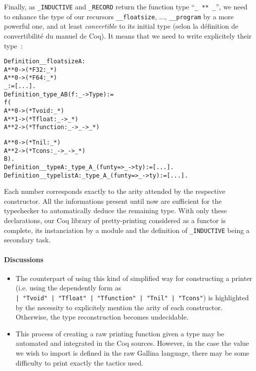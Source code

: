 \documentclass[a4paper, 11pt]{article}
\newenvironment{coq}
  {\selectlanguage{english} \begin{alltt}} %% 8.3pl1 (January 2011)
  {\end{alltt} \selectlanguage{francais}}
\begin{document}
Finally, as \verb|_INDUCTIVE| and \verb|_RECORD| return the function type ``\verb|_ ** _|'', we need to enhance the type of our recursors \verb|__floatsize|, ..., \verb|__program| by a more powerful one, and at least \emph{convertible} to its initial type (selon la définition de convertibilité du manuel de Coq). It means that we need to write explicitely their type~:
\begin{coq}
Definition __floatsize {A} : 
    A ** 0 ->                (* F32       :           _ *)
    A ** 0 ->                (* F64       :           _ *)
    _ := [...].
Definition _type_ A B (f : _ -> Type) := 
  f (
    A ** 0 ->                (* Tvoid     :           _ *)
    A ** 1 ->                (* Tfloat    : _ ->      _ *)
    A ** 2 ->                (* Tfunction : _ -> _ -> _ *)

    A ** 0 ->                (* Tnil      :           _ *)
    A ** 2 ->                (* Tcons     : _ -> _ -> _ *)
  B).
Definition __type {A} : _type_ A _ (fun ty => _ -> ty) := [...].
Definition __typelist {A} : _type_ A _ (fun ty => _ -> ty) := [...].
\end{coq}
Each number corresponds exactly to the arity attended by the respective constructor.
All the informations present until now are sufficient for the typechecker to automatically deduce the remaining type. With only these declarations, our Coq library of pretty-printing considered as a functor is complete, its instanciation by a module and the definition of \verb|_INDUCTIVE| being a secondary task.
\paragraph{Discussions}
\begin{itemize}
\item
The counterpart of using this kind of simplified way for constructing a printer (i.e. using the dependently form as \\ 
\verb_| "Tvoid" | "Tfloat" | "Tfunction" | "Tnil" | "Tcons"_) is highlighted by the necessity to explicitely mention the arity of each constructor. Otherwise, the type reconstruction becomes undecidable.
\item
This process of creating a raw printing function given a type may be automated and integrated in the Coq sources. However, in the case the value we wish to import is defined in the raw Gallina language, there may be some difficulty to print exactly the tactics used.
\end{itemize}
\end{document}
